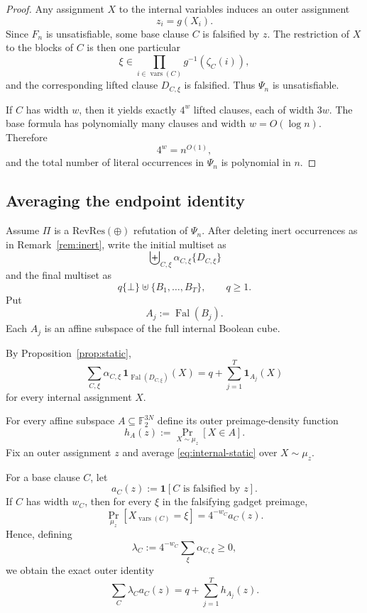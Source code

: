 \documentclass[11pt]{article}
\theoremstyle{definition}
\newcommand{\F}{\mathbb F}
\newcommand{\RevRes}{\mathrm{RevRes}}
\newcommand{\Fal}{\operatorname{Fal}}
\newcommand{\Prb}{\mathop{\Pr}}
\begin{document}
\begin{proof}
Any assignment $X$ to the internal variables induces an outer assignment
\[
  z_i=g(X_i).
\]
Since $F_n$ is unsatisfiable, some base clause $C$ is falsified by $z$.
The restriction of $X$ to the blocks of $C$ is then one particular
\[
  \xi\in\prod_{i\in\operatorname{vars}(C)}g^{-1}(\zeta_C(i)),
\]
and the corresponding lifted clause $D_{C,\xi}$ is falsified.
Thus $\Psi_n$ is unsatisfiable.

If $C$ has width $w$, then it yields exactly $4^w$ lifted clauses, each of width $3w$.
The base formula has polynomially many clauses and width $w=O(\log n)$.
Therefore
\[
  4^w=n^{O(1)},
\]
and the total number of literal occurrences in $\Psi_n$ is polynomial in $n$.
\end{proof}

\subsection{Averaging the endpoint identity}

Assume $\Pi$ is a $\RevRes(\oplus)$ refutation of $\Psi_n$.
After deleting inert occurrences as in Remark~\ref{rem:inert}, write the initial
multiset as
\[
  \biguplus_{C,\xi}\alpha_{C,\xi}\{D_{C,\xi}\}
\]
and the final multiset as
\[
  q\{\bot\}\uplus\{B_1,\dots,B_T\},
  \qquad q\ge1.
\]
Put
\[
  A_j:=\Fal(B_j).
\]
Each $A_j$ is an affine subspace of the full internal Boolean cube.

By Proposition~\ref{prop:static},
\[
  \sum_{C,\xi}
  \alpha_{C,\xi}\,
  \mathbf1_{\Fal(D_{C,\xi})}(X)
  =
  q+\sum_{j=1}^T\mathbf1_{A_j}(X)
  \tag{3.3}\label{eq:internal-static}
\]
for every internal assignment $X$.

\label{sec:overview-step2-detail}
For every affine subspace $A\subseteq\F_2^{3N}$ define its outer preimage-density function
\[
  h_A(z):=\Prb_{X\sim\mu_z}[X\in A].
  \tag{3.4}\label{eq:hA}
\]
Fix an outer assignment $z$ and average \eqref{eq:internal-static} over
$X\sim\mu_z$.

For a base clause $C$, let
\[
  a_C(z):=\mathbf1[C\text{ is falsified by }z].
  \tag{3.5}\label{eq:axiom-ind}
\]
If $C$ has width $w_C$, then for every $\xi$ in the falsifying gadget preimage,
\[
  \Prb_{\mu_z}[X_{\operatorname{vars}(C)}=\xi]
  =
  4^{-w_C}a_C(z).
\]
Hence, defining
\[
  \lambda_C
  :=
  4^{-w_C}\sum_\xi\alpha_{C,\xi}\ge0,
  \tag{3.6}\label{eq:lambda}
\]
we obtain the exact outer identity
\[
  \sum_C\lambda_C a_C(z)
  =
  q+\sum_{j=1}^T h_{A_j}(z).
  \tag{3.7}\label{eq:outer-static}
\]
\end{document}
